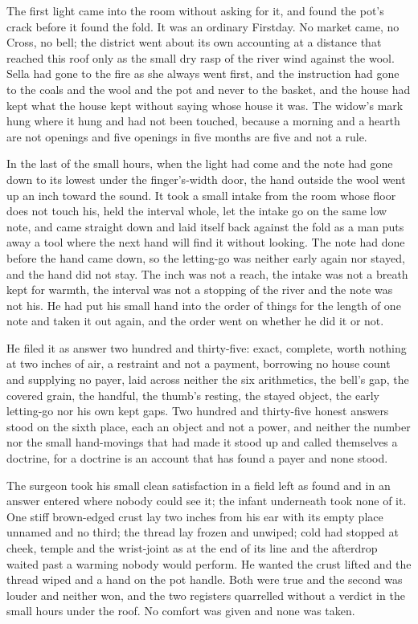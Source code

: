 \scenebreak

The first light came into the room without asking for it, and found the pot's crack before it found the fold. It was an ordinary Firstday. No market came, no Cross, no bell; the district went about its own accounting at a distance that reached this roof only as the small dry rasp of the river wind against the wool. Sella had gone to the fire as she always went first, and the instruction had gone to the coals and the wool and the pot and never to the basket, and the house had kept what the house kept without saying whose house it was. The widow's mark hung where it hung and had not been touched, because a morning and a hearth are not openings and five openings in five months are five and not a rule.

In the last of the small hours, when the light had come and the note had gone down to its lowest under the finger's-width door, the hand outside the wool went up an inch toward the sound. It took a small intake from the room whose floor does not touch his, held the interval whole, let the intake go on the same low note, and came straight down and laid itself back against the fold as a man puts away a tool where the next hand will find it without looking. The note had done before the hand came down, so the letting-go was neither early again nor stayed, and the hand did not stay. The inch was not a reach, the intake was not a breath kept for warmth, the interval was not a stopping of the river and the note was not his. He had put his small hand into the order of things for the length of one note and taken it out again, and the order went on whether he did it or not.

He filed it as answer two hundred and thirty-five: exact, complete, worth nothing at two inches of air, a restraint and not a payment, borrowing no house count and supplying no payer, laid across neither the six arithmetics, the bell's gap, the covered grain, the handful, the thumb's resting, the stayed object, the early letting-go nor his own kept gaps. Two hundred and thirty-five honest answers stood on the sixth place, each an object and not a power, and neither the number nor the small hand-movings that had made it stood up and called themselves a doctrine, for a doctrine is an account that has found a payer and none stood.

The surgeon took his small clean satisfaction in a field left as found and in an answer entered where nobody could see it; the infant underneath took none of it. One stiff brown-edged crust lay two inches from his ear with its empty place unnamed and no third; the thread lay frozen and unwiped; cold had stopped at cheek, temple and the wrist-joint as at the end of its line and the afterdrop waited past a warming nobody would perform. He wanted the crust lifted and the thread wiped and a hand on the pot handle. Both were true and the second was louder and neither won, and the two registers quarrelled without a verdict in the small hours under the roof. No comfort was given and none was taken.

